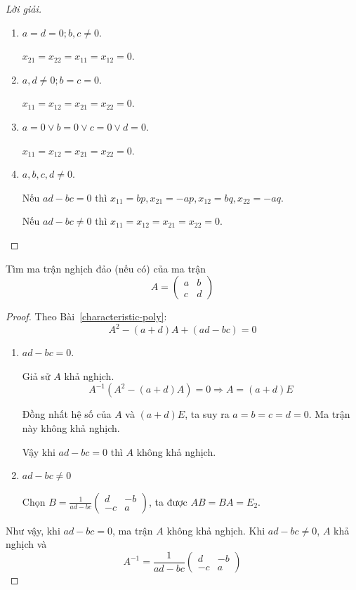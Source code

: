 \begin{proof}[Lời giải]
\begin{enumerate}[label = Trường hợp \arabic*:,itemindent=2cm]
              $x_{11} = x_{12} = 0$.
        \item $a = d = 0; b, c\ne 0$.
              
              $x_{21} = x_{22} = x_{11} = x_{12} = 0$.
        \item $a, d\ne 0; b = c = 0$.
              
              $x_{11} = x_{12} = x_{21} = x_{22} = 0$.
        \item $a = 0\vee b = 0 \vee c = 0 \vee d = 0$.
              
              $x_{11} = x_{12} = x_{21} = x_{22} = 0$.
        \item $a,b,c,d\ne 0$.
              
              Nếu $ad - bc = 0$ thì $x_{11} = bp, x_{21} = -ap, x_{12} = bq, x_{22} = -aq$.
              
              Nếu $ad - bc \ne 0$ thì $x_{11} = x_{12} = x_{21} = x_{22} = 0$.
    \end{enumerate}
\end{proof}

\begin{exercise}
    Tìm ma trận nghịch đảo (nếu có) của ma trận
    \[
        A =
        \begin{pmatrix}
            a & b \\
            c & d
        \end{pmatrix}
    \]
\end{exercise}

\begin{proof}
    Theo Bài~\ref{characteristic-poly}:
    \[
        A^{2} - (a+d)A + (ad-bc) = 0
    \]
    \begin{enumerate}[label = Trường hợp \arabic*:,itemindent=2cm]
        \item $ad - bc = 0$.
              \par Giả sử $A$ khả nghịch.
              \[
                  A^{-1}(A^{2} - (a+d)A) = 0 \Rightarrow A = (a+d)E
              \]
              \par Đồng nhất hệ số của $A$ và $(a+d)E$, ta suy ra $a = b = c =d = 0$. Ma trận này không khả nghịch.
              \par Vậy khi $ad - bc = 0$ thì $A$ không khả nghịch.
        \item $ad - bc \ne 0$

              Chọn $B = \frac{1}{ad - bc}\begin{pmatrix}d & -b \\ -c & a\end{pmatrix}$, ta được $AB = BA = E_{2}$.
    \end{enumerate}
    
    Như vậy, khi $ad - bc = 0$, ma trận $A$ không khả nghịch. Khi $ad - bc \ne 0$, $A$ khả nghịch và
    \[
        A^{-1} = \frac{1}{ad-bc}\begin{pmatrix}d & -b \\ -c & a\end{pmatrix}
    \]
\end{proof}

